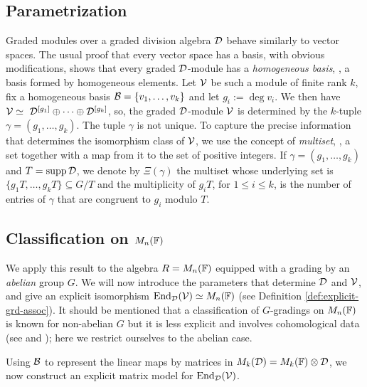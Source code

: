 \subsection{Parametrization}



Graded modules over a graded division algebra $\mathcal D$ behave similarly to vector spaces. The usual proof that every vector space has a basis, with obvious modifications, shows that every graded $\mathcal D$-module has a \emph{homogeneous basis}, \ie, a basis formed by homogeneous elements.
Let $\mathcal V$ be such a module of finite rank $k$, fix a homogeneous basis $\mathcal B = \{v_1, \ldots, v_k\}$ and let $g_i := \operatorname{deg} v_i$. We then have $\mc{V}\iso \ \D^{[g_1]}\oplus\cdots\oplus\D^{[g_k]}$, so, the graded $\mathcal D$-module $\mathcal V$ is determined by the $k$-tuple $\gamma = (g_1,\ldots, g_k)$. The tuple $\gamma$ is not unique. To capture the precise information that determines the isomorphism class of $\mathcal V$, we use the concept of \emph{multiset}, \ie, a set together with a map from it to the set of positive integers. If $\gamma = (g_1,\ldots, g_k)$ and $T=\operatorname{supp} \mathcal{D}$, we denote by $\Xi(\gamma)$ the multiset whose underlying set is $\{g_1 T,\ldots, g_k T\} \subseteq G/T$ and the multiplicity of $g_i T$, for $1\leq i\leq k$, is the number of entries of $\gamma$ that are congruent to $g_i$ modulo $T$.

\subsection{Classification on $M_n(\mathbb{F})$}


We apply this result to the algebra $R=M_n(\mathbb{F})$ equipped with a grading by an \emph{abelian} group $G$. We will now introduce the parameters that determine 
$\mathcal D$ and $\mathcal V$, and give an explicit isomorphism $\operatorname{End}_{\mathcal{D}} (\mathcal V)\simeq M_n(\mathbb{F})$ (see Definition \ref{def:explicit-grd-assoc}). It should be mentioned that a classification of $G$-gradings on $M_n(\mathbb{F})$ is known for non-abelian $G$ but it is less explicit and involves cohomological data (see \cite[Corollary 2.22]{livromicha} and \cite[Theorem 1.3]{GS}); here we restrict ourselves to the abelian case.


Using $\mathcal B$ to represent the linear maps by matrices in $M_k(\mathcal{D}) = M_k(\mathbb{F})\otimes \mathcal{D}$, we now construct an explicit matrix model for $\operatorname{End}_{\mathcal{D}}(\mathcal V)$.

